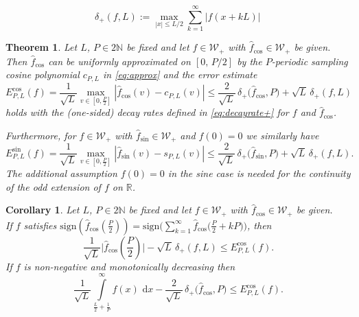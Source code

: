 \documentclass[10pt,a4paper]{amsart}
\newtheorem{theorem}{Theorem}
\newtheorem{corollary}{Corollary}
\newcommand{\Ecos}{E^{\cos}}
\newcommand{\Esin}{E^{\sin}}
\newcommand{\N}{\mathbb N}
\newcommand{\R}{\mathbb R}
\newcommand{\Wp}{{\mathcal W}_{+}}
\renewcommand{\d}{\,\mathrm{d}}
\newcommand{\dpl}{\delta_{+}}
\newcommand{\fcos}{{\hat f}_{\cos}}
\newcommand{\fsin}{{\hat f}_{\sin}}
\newcommand{\sign}{\mathrm{sign}}
\begin{document}
\begin{equation}
\label{eq:decayrate+}
\textstyle \dpl(f,L) := \max\limits_{|x| \leq L/2} \sum\limits_{k = 1}^{\infty} |f(x + k L)|\,
\end{equation}

\begin{theorem}
\label{Thm:samplingcospolynomial}
Let $L$, $P \in 2 \N$ be fixed and let $f \in \Wp$ with $\fcos \in \Wp$ be given.
Then $\fcos$ can be uniformly approximated on $[0,\,P/2]$ by the $P$-periodic
sampling cosine polynomial $c_{P,L}$ in  \eqref{eq:approx}
and  the error
estimate
\begin{equation}
\label{eq:cosmain}
 \textstyle \Ecos_{P,L}(f) =  \textstyle \frac{1}{\sqrt{L}} \max\limits_{v \in [0,\frac{P}{2}]} |\hat{f}_{\cos} (v)\! - \!c_{P,L}(v)|\leq \frac{2}{\sqrt L}\,\dpl\big(\fcos, P\big) + \sqrt L \,\dpl(f,L)
\end{equation}
holds with the (one-sided) decay rates defined in \eqref{eq:decayrate+} for $f$ and $\fcos$.

Furthermore, for $f \in \Wp$ with $\fsin \in \Wp$ and $f(0)=0$  we similarly  have
\begin{equation}
\label{eq:sinmain}
 \textstyle \Esin_{P,L}(f)= \textstyle \frac{1}{\sqrt{L}} \max\limits_{v \in [0,\frac{P}{2}]} |\hat{f}_{\sin} (v)\! - \!s_{P,L}(v)|
  \leq \frac{2}{\sqrt L}\,\dpl\big(\fsin, P\big) + \sqrt L \,\dpl(f,L).
\end{equation}
The additional assumption $f(0)=0$ in the sine case is needed for the continuity of the odd
extension of $f$ on $\R$.
\end{theorem}

\begin{corollary}\label{corlower}
Let $L$, $P \in 2 \N$ be fixed and let $f \in \Wp$ with $\fcos \in \Wp$ be given.\\
If $f$ satisfies $\sign(\fcos(\frac{P}{2})) = \sign\big(\sum_{k=1}^\infty \fcos\big(\frac{P}{2} +kP\big)\big)$, then
\begin{equation}
\label{eq:cosbelow1}
 \textstyle    \frac{1}{\sqrt{L}} \big|\fcos(\frac{P}{2}) \big| - \sqrt{L} \,\dpl(f,L)
 \leq \Ecos_{P,L}(f).
\end{equation}
If $f$ is non-negative and monotonically decreasing then
\begin{equation}
\label{eq:cosbelow2}
 \textstyle   \frac{1}{\sqrt{L}}  \int\limits_{\frac{L}{2} + \frac{1}{P}}^{\infty} f(x) \, \d x-  \frac{2}{\sqrt L}\,\dpl\big(\fcos, P\big)
 \leq \Ecos_{P,L}(f).
\end{equation}
\end{corollary}
\end{document}
